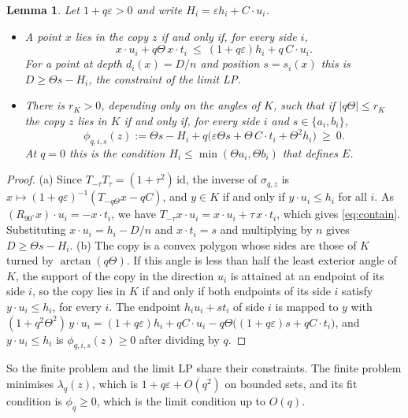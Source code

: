 \documentclass[11pt]{amsart}
\newtheorem{lemma}[theorem]{Lemma}
\theoremstyle{remark}\newtheorem{remark}[theorem]{Remark}
\begin{document}
\begin{lemma}\label{lem:tangent}
Let $1+q\varepsilon>0$ and write $H_i=\varepsilon h_i+C\cdot u_i$.
\begin{itemize}
\item[(a)] A point $x$ lies in the copy $z$ if and only if, for every side $i$,
\begin{equation}\label{eq:contain}
x\cdot u_i+q\Theta\,x\cdot t_i\ \le\ (1+q\varepsilon)h_i+q\,C\cdot u_i .
\end{equation}
For a point at depth $d_i(x)=D/n$ and position $s=s_i(x)$ this is $D\ge\Theta s-H_i$, the constraint of the limit LP.
\item[(b)] There is $r_K>0$, depending only on the angles of $K$, such that if $|q\Theta|\le r_K$ the copy $z$ lies in
$K$ if and only if, for every side $i$ and $s\in\{a_i,b_i\}$,
\[
\phi_{q,i,s}(z):=\Theta s-H_i+q\big(\varepsilon\Theta s+\Theta\,C\cdot t_i+\Theta^2h_i\big)\ \ge\ 0 .
\]
At $q=0$ this is the condition $H_i\le\min(\Theta a_i,\Theta b_i)$ that defines $E$.
\end{itemize}
\end{lemma}

\begin{proof}
(a) Since $T_{-\tau}T_\tau=(1+\tau^2)\,\mathrm{id}$, the inverse of $\sigma_{q,z}$ is $x\mapsto(1+q\varepsilon)^{-1}
(T_{-q\Theta}x-qC)$, and $y\in K$ if and only if $y\cdot u_i\le h_i$ for all $i$. As $(R_{90^\circ}x)\cdot
u_i=-x\cdot t_i$, we have $T_{-\tau}x\cdot u_i=x\cdot u_i+\tau\,x\cdot t_i$, which gives \eqref{eq:contain}. Substituting
$x\cdot u_i=h_i-D/n$ and $x\cdot t_i=s$ and multiplying by $n$ gives $D\ge\Theta s-H_i$.
(b) The copy is a convex polygon whose sides are those of $K$ turned by $\arctan(q\Theta)$. If this angle is less than
half the least exterior angle of $K$, the support of the copy in the direction $u_i$ is attained at an endpoint of its
side $i$, so the copy lies in $K$ if and only if both endpoints of its side $i$ satisfy $y\cdot u_i\le h_i$, for every
$i$. The endpoint $h_iu_i+st_i$ of side $i$ is mapped to $y$ with
$(1+q^2\Theta^2)\,y\cdot u_i=(1+q\varepsilon)h_i+qC\cdot u_i-q\Theta\big((1+q\varepsilon)s+qC\cdot t_i\big)$, and
$y\cdot u_i\le h_i$ is $\phi_{q,i,s}(z)\ge0$ after dividing by $q$.
\end{proof}

So the finite problem and the limit LP share their constraints. The finite problem minimises $\lambda_q(z)$, which is
$1+q\varepsilon+O(q^2)$ on bounded sets, and its fit condition is $\phi_q\ge0$, which is the limit condition up to
$O(q)$.
\end{document}
